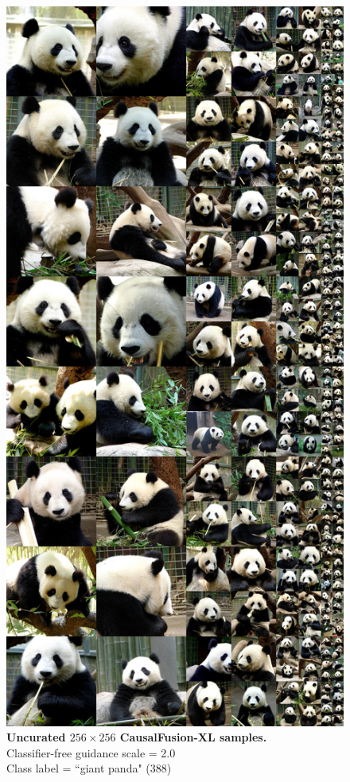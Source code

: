 \begin{figure}\centering
\includegraphics[width=\linewidth]{figs/xl256_388_cfg2.0.jpg}
\caption{\textbf{Uncurated $256\times256$ CausalFusion-XL samples.} \\Classifier-free guidance scale = 2.0\\Class label = ``giant panda" (388)}\vspace{-2mm}
\label{fig:samples256_3}
\end{figure}


